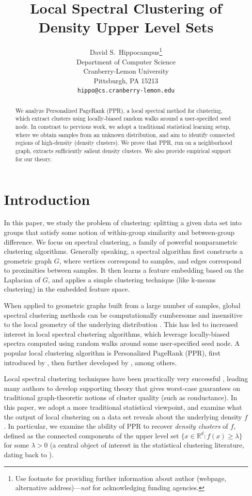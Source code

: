 \documentclass{article}
\title{Local Spectral Clustering of Density Upper Level Sets}
\author{%
  David S.~Hippocampus\thanks{Use footnote for providing further information
    about author (webpage, alternative address)---\emph{not} for acknowledging
    funding agencies.} \\
  Department of Computer Science\\
  Cranberry-Lemon University\\
  Pittsburgh, PA 15213 \\
  \texttt{hippo@cs.cranberry-lemon.edu} \\
}
\newcommand{\Reals}{\mathbb{R}}
\newcommand{\Rd}{\Reals^d}
\newcommand{\1}{\mathbf{1}}
\theoremstyle{aldenthm}
\theoremstyle{aldenrmrk}
\begin{document}
\maketitle

\begin{abstract}
We analyze Personalized PageRank (PPR), a local spectral method for clustering,
which extract clusters using locally-biased random walks around a user-specified
seed node.  In constrast to pervious work, we adopt a traditional statistical
learning setup, where we obtain samples from an unknown distribution, and aim to
identify connected regions of high-density (density clusters).  We prove that
PPR, run on a neighborhood graph, extracts sufficiently salient density
clusters. We also provide empirical support for our theory.
\end{abstract}

\section{Introduction}
\label{sec: introduction}

In this paper, we study the problem of clustering: splitting a given data set
into groups that satisfy some notion of within-group similarity and
between-group difference.  We focus on spectral clustering, a family of powerful
nonparametric clustering algorithms.  Generally speaking, a spectral algorithm
first constructs a geometric graph $G$, where vertices correspond to samples,
and edges correspond to proximities between samples. It then learns a feature
embedding based on the Laplacian of $G$, and applies a simple clustering
technique (like k-means clustering) in the embedded feature space.

When applied to geometric graphs built from a large number of samples,
global spectral clustering methods can be computationally cumbersome and   
insensitive to the local geometry of the underlying distribution
\citep{leskovec2010,mahoney2012}.  This has led to increased interest in
local spectral clustering algorithms, which leverage locally-biased spectra
computed using random walks around some user-specified seed node.  A popular 
local clustering algorithm is Personalized PageRank (PPR), first introduced by 
\citet{haveliwala2003}, then further developed by
\citep{spielman2011,spielman2014,andersen2006,mahoney2012,zhu2013},
among others.  

Local spectral clustering techniques have been practically very successful
\citep{leskovec2010,andersen2012,gleich2012,mahoney2012,wu2012}, leading 
many authors to develop supporting theory
\citep{spielman2013,andersen2009,gharan2012,zhu2013} that gives worst-case
guarantees on traditional graph-theoretic notions of cluster quality (such as
conductance).  In this paper, we adopt a more traditional statistical viewpoint,
and examine what the output of local clustering on a data set reveals about the
underlying density $f$.  In particular, we examine the ability of PPR to recover
\emph{density clusters} of $f$, defined as the connected components of
the upper level set $\{x \in \Rd : f(x) \geq \lambda\}$ for some $\lambda > 0$
(a central object of interest in the statistical clustering literature, dating
back to \citet{hartigan1981}).   
\end{document}
